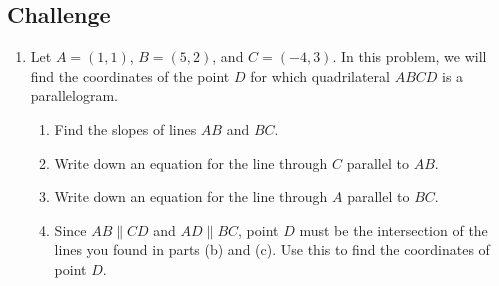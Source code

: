 \subsection{Challenge}

\begin{enumerate}[resume]
\item Let $A = (1,1)$, $B = (5,2)$, and $C = (-4,3)$. In this problem, we will find the coordinates of the point $D$ for which quadrilateral $ABCD$ is a parallelogram.
\begin{enumerate}
\item Find the slopes of lines $AB$ and $BC$.
\item Write down an equation for the line through $C$ parallel to $AB$.
\item Write down an equation for the line through $A$ parallel to $BC$.
\item Since $AB\parallel CD$ and $AD\parallel BC$, point $D$ must be the intersection of the lines you found in parts (b) and (c). Use this to find the coordinates of point $D$.
\end{enumerate}
\end{enumerate}